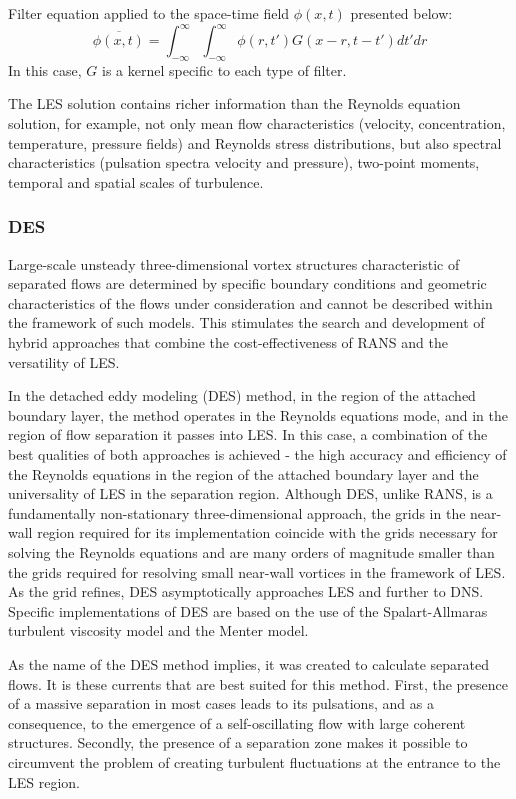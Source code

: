 	Filter equation applied to the space-time field $\phi(x,t)$ presented below:
	\begin{equation}
		\overline{\phi(x,t)} = \int_{-\infty}^{\infty}\int_{-\infty}^{\infty}\phi(r,t')G(x - r, t - t')dt'dr
	\end{equation}
	In this case, $G$ is a kernel specific to each type of filter.
	
	The LES solution contains richer information than the Reynolds equation solution, for example, not only mean flow characteristics (velocity, concentration, temperature, pressure fields) and Reynolds stress distributions, but also spectral characteristics (pulsation spectra velocity and pressure), two-point moments, temporal and spatial scales of turbulence.
	
\subsubsection{DES}
	Large-scale unsteady three-dimensional vortex structures characteristic of separated flows are determined by specific boundary conditions and geometric characteristics of the flows under consideration and cannot be described within the framework of such models. This stimulates the search and development of hybrid approaches that combine the cost-effectiveness of RANS and the versatility of LES.
	
	In the detached eddy modeling (DES) method, in the region of the attached boundary layer, the method operates in the Reynolds equations mode, and in the region of flow separation it passes into LES. In this case, a combination of the best qualities of both approaches is achieved - the high accuracy and efficiency of the Reynolds equations in the region of the attached boundary layer and the universality of LES in the separation region. Although DES, unlike RANS, is a fundamentally non-stationary three-dimensional approach, the grids in the near-wall region required for its implementation coincide with the grids necessary for solving the Reynolds equations and are many orders of magnitude smaller than the grids required for resolving small near-wall vortices in the framework of LES. As the grid refines, DES asymptotically approaches LES and further to DNS. Specific implementations of DES are based on the use of the Spalart-Allmaras turbulent viscosity model and the Menter model\cite{Strelets2001}.
	
	As the name of the DES method implies, it was created to calculate separated flows. It is these currents that are best suited for this method. First, the presence of a massive separation in most cases leads to its pulsations, and as a consequence, to the emergence of a self-oscillating flow with large coherent structures. Secondly, the presence of a separation zone makes it possible to circumvent the problem of creating turbulent fluctuations at the entrance to the LES region.
	
